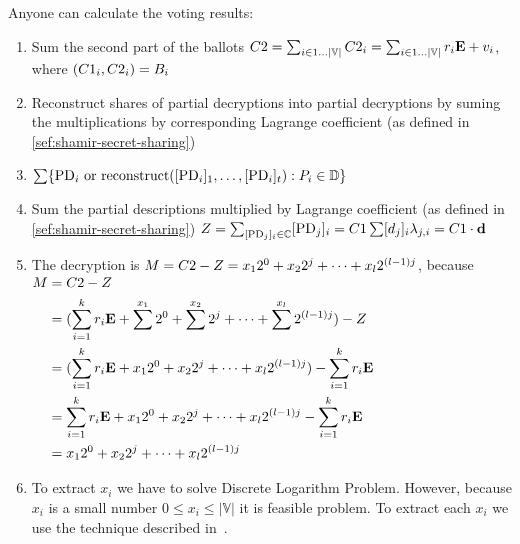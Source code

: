 \documentclass[runningheads]{llncs}
\begin{document}
Anyone can calculate the voting results:
\begin{enumerate}
    \item Sum the second part of the ballots $C2 = \sum_{i \in 1 \dots |\mathbb{V}|} C2_{i} = \sum_{i \in 1 \dots |\mathbb{V}|} r_{i} \textbf{E} + v_{i}$, where $(C1_{i},C2_{i})=B_{i}$
    
    \item Reconstruct shares of partial decryptions into partial decryptions by suming the multiplications by corresponding Lagrange coefficient (as defined in \ref{sef:shamir-secret-sharing}) %

    \item $\sum \{\mathrm{PD}_{i} \textrm{ or reconstruct}([\mathrm{PD}_{i}]_{1},\dots,[\mathrm{PD}_{i}]_{t}) : P_i \in \mathbb{D}\}$
    \item Sum the partial descriptions multiplied by Lagrange coefficient (as defined in \ref{sef:shamir-secret-sharing}) $Z=\sum_{[\mathrm{PD}_{j}]_{i} \in \mathbb{C}} [\mathrm{PD}_{j}]_{i} = C1 \sum  [d_{j}]_{i} \lambda_{j,i} = C1 \cdot \textbf{d}{}$
    
    \item The decryption is $M=C2{} - Z=x_1 2^0 + x_2 2^j + \dots + x_l 2^{(l-1)j}$, because $\begin{aligned} M&=C2-Z \\
        &= (\sum_{i=1}^k r_{i} \mathbf{E} + \sum^{x_1} 2^0 + \sum^{x_2} 2^j + \dots + \sum^{x_l} 2^{(l-1)j}) - Z\\
        &= (\sum_{i=1}^k r_{i} \mathbf{E} + x_1 2^0 + x_2 2^j + \dots + x_l 2^{(l-1)j}) - \sum_{i=1}^k r_{i} \mathbf{E}\\
        &= \sum_{i=1}^k r_{i} \mathbf{E} + x_1 2^0 + x_2 2^j + \dots + x_l 2^{(l-1)j} - \sum_{i=1}^k r_{i} \mathbf{E}\\
        &= x_1 2^0 + x_2 2^j + \dots + x_l 2^{(l-1)j}\\
        \end{aligned}$
    \item To extract $x_i$ we have to solve Discrete Logarithm Problem. However, because $x_i$ is a small number $0 \leq x_i \leq |\mathbb{V}|$ it is feasible problem. To extract each $x_i$ we use the technique described in~\cite{haoAnonymousVotingTworound2010}.
\end{enumerate}
\end{document}
